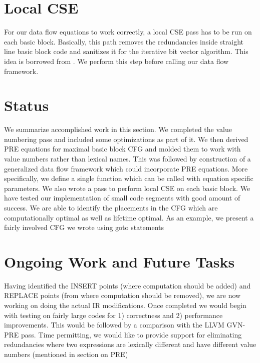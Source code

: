 \begin{figure}[htbp]
\begin{center}
\end{center}
  \caption{\label{fig:2} }
\end{figure}



\section{Local CSE}
For our data flow equations to work correctly, a local CSE pass has to be run
on each basic block. Basically, this path removes the redundancies inside
straight line basic block code and sanitizes it for the iterative bit vector
algorithm. This idea is borrowed from \cite{Knoop:1994:OCM:183432.183443}. We perform this step before calling
our data flow framework. 


\section{Status} 
We summarize accomplished work in this section. We completed the value numbering pass and included some 
optimizations as part of it. We then derived PRE equations for maximal basic block CFG and molded them 
to work with value numbers rather than lexical names. This was followed by construction of a generalized 
data flow framework which could incorporate PRE equations. More specifically, we define a single function 
which can be called with equation specific parameters. We also wrote a pass to perform local CSE on each basic block.
We have tested our implementation of small code segments with good amount of success. We are able to identify 
the placements in the CFG which are computationally optimal as well as lifetime optimal. As an example, we present 
a fairly involved CFG we wrote using goto statements  

\section{Ongoing Work and Future Tasks}
Having identified the INSERT points (where computation should be added) and REPLACE points (from where computation should be removed), 
we are now working on doing the actual IR modifications. Once completed we would begin with testing on fairly large codes for 1) 
correctness and 2) performance improvements. This would be followed by a comparison with the LLVM GVN-PRE pass. Time permitting, 
we would like to provide support for eliminating redundancies where two expressions are lexically different and have different value numbers 
(mentioned in section on PRE)

           
